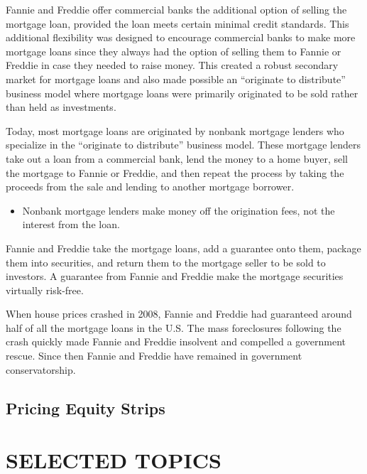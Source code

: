 \documentclass[
]{book}
\providecommand{\tightlist}{%
  \setlength{\itemsep}{0pt}\setlength{\parskip}{0pt}}
\begin{document}
Fannie and Freddie offer commercial banks the additional option of selling the mortgage loan, provided the loan meets certain minimal credit standards. This additional flexibility was designed to encourage commercial banks to make more mortgage loans since they always had the option of selling them to Fannie or Freddie in case they needed to raise money. This created a robust secondary market for mortgage loans and also made possible an ``originate to distribute'' business model where mortgage loans were primarily originated to be sold rather than held as investments.

Today, most mortgage loans are originated by nonbank mortgage lenders who specialize in the ``originate to distribute'' business model. These mortgage lenders take out a loan from a commercial bank, lend the money to a home buyer, sell the mortgage to Fannie or Freddie, and then repeat the process by taking the proceeds from the sale and lending to another mortgage borrower.

\begin{itemize}
\tightlist
\item
  Nonbank mortgage lenders make money off the origination fees, not the interest from the loan.
\end{itemize}

Fannie and Freddie take the mortgage loans, add a guarantee onto them, package them into securities, and return them to the mortgage seller to be sold to investors. A guarantee from Fannie and Freddie make the mortgage securities virtually risk-free.

When house prices crashed in 2008, Fannie and Freddie had guaranteed around half of all the mortgage loans in the U.S. The mass foreclosures following the crash quickly made Fannie and Freddie insolvent and compelled a government rescue. Since then Fannie and Freddie have remained in government conservatorship.

\hypertarget{pricing-equity-strips}{%
\chapter{Pricing Equity Strips}\label{pricing-equity-strips}}

\hypertarget{part-selected-topics}{%
\part*{SELECTED TOPICS}\label{part-selected-topics}}
\end{document}
